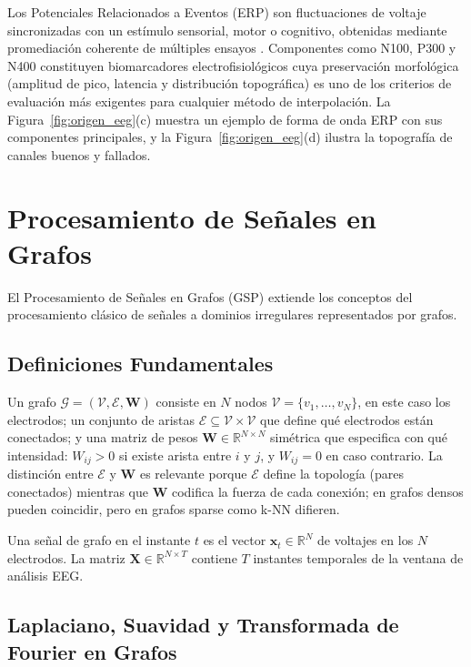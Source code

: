 Los Potenciales Relacionados a Eventos (ERP) son fluctuaciones de voltaje sincronizadas con un estímulo sensorial, motor o cognitivo, obtenidas mediante promediación coherente de múltiples ensayos \cite{luck2014introduction}. Componentes como N100, P300 y N400 constituyen biomarcadores electrofisiológicos cuya preservación morfológica (amplitud de pico, latencia y distribución topográfica) es uno de los criterios de evaluación más exigentes para cualquier método de interpolación. La Figura~\ref{fig:origen_eeg}(c) muestra un ejemplo de forma de onda ERP con sus componentes principales, y la Figura~\ref{fig:origen_eeg}(d) ilustra la topografía de canales buenos y fallados.

\section{Procesamiento de Señales en Grafos}

El Procesamiento de Señales en Grafos (GSP) \cite{shuman2013,ortega2018} extiende los conceptos del procesamiento clásico de señales a dominios irregulares representados por grafos.

\subsection{Definiciones Fundamentales}

Un grafo $\mathcal{G} = (\mathcal{V}, \mathcal{E}, \mathbf{W})$ consiste en $N$ nodos $\mathcal{V} = \{v_1, \dots, v_N\}$, en este caso los electrodos; un conjunto de aristas $\mathcal{E} \subseteq \mathcal{V} \times \mathcal{V}$ que define qué electrodos están conectados; y una matriz de pesos $\mathbf{W} \in \mathbb{R}^{N \times N}$ simétrica que especifica con qué intensidad: $W_{ij} > 0$ si existe arista entre $i$ y $j$, y $W_{ij} = 0$ en caso contrario. La distinción entre $\mathcal{E}$ y $\mathbf{W}$ es relevante porque $\mathcal{E}$ define la topología (pares conectados) mientras que $\mathbf{W}$ codifica la fuerza de cada conexión; en grafos densos pueden coincidir, pero en grafos sparse como k-NN difieren.

Una señal de grafo en el instante $t$ es el vector $\mathbf{x}_t \in \mathbb{R}^N$ de voltajes en los $N$ electrodos. La matriz $\mathbf{X} \in \mathbb{R}^{N \times T}$ contiene $T$ instantes temporales de la ventana de análisis EEG.

\subsection{Laplaciano, Suavidad y Transformada de Fourier en Grafos}

